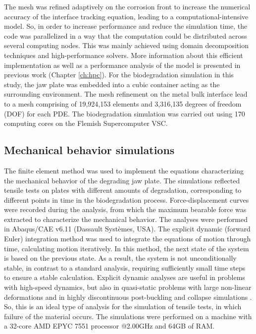 The mesh was refined adaptively on the corrosion front to increase the numerical accuracy of the interface tracking equation, leading to a computational-intensive model. So, in order to increase performance and reduce the simulation time, the code was parallelized in a way that the computation could be distributed across several computing nodes. This was mainly achieved using domain decomposition techniques and high-performance solvers. More information about this efficient implementation as well as a performance analysis of the model is presented in previous work \cite{Barzegari2022} (Chapter \ref{ch:hpc}). For the biodegradation simulation in this study, the jaw plate was embedded into a cubic container acting as the surrounding environment. The mesh refinement on the metal bulk interface lead to a mesh comprising of 19,924,153 elements and 3,316,135 degrees of freedom ({DOF}) for each {PDE}. The biodegradation simulation was carried out using 170 computing cores on the Flemish Supercomputer VSC.


\subsection{Mechanical behavior simulations}
\label{sec:FEA}

The finite element method was used to implement the equations characterizing the mechanical behavior of the degrading jaw plate. The simulations reflected tensile tests on plates with different amounts of degradation, corresponding to different points in time in the biodegradation process. Force-displacement curves were recorded during the analysis, from which the maximum bearable force was extracted to characterize the mechanical behavior. The analyses were performed in Abaqus/CAE v6.11 (Dassault Systèmes, USA). The explicit dynamic (forward Euler) integration method was used to integrate the equations of motion through time, calculating motion iteratively. In this method, the next state of the system is based on the previous state. As a result, the system is not unconditionally stable, in contrast to a standard analysis, requiring sufficiently small time steps to ensure a stable calculation. Explicit dynamic analyses are useful in problems with high-speed dynamics, but also in quasi-static problems with large non-linear deformations and in highly discontinuous post-buckling and collapse simulations \cite{explicit2}. So, this is an ideal type of analysis for the simulation of tensile tests, in which failure of the material occurs. The simulations were performed on a machine with a 32-core AMD EPYC 7551 processor @2.00GHz and 64GB of RAM.

